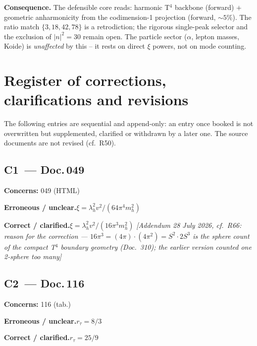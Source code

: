 \textbf{Consequence.} The defensible core reads: harmonic T$^4$ backbone
(forward) $+$ geometric anharmonicity from the codimension-1 projection
(forward, $\sim5\%$). The ratio match $\{3,18,42,78\}$ is a retrodiction; the
rigorous single-peak selector and the exclusion of $|n|^2=30$ remain open. The
particle sector ($\alpha$, lepton masses, Koide) is \emph{unaffected} by this
-- it rests on direct $\xi$ powers, not on mode counting.

\section{Register of corrections, clarifications and revisions}

\noindent The following entries are sequential and append-only: an entry once booked is not overwritten but supplemented, clarified or withdrawn by a later one. The source documents are not revised (cf.\ R50).


\subsection*{C1~--- Doc.\,049}

\noindent\textbf{Concerns:} 049 (HTML)


\smallskip\noindent\textbf{Erroneous / unclear.}\quad $\xi = \lambda_h^2 v^2/(64\pi^4 m_h^2)$


\smallskip\noindent\textbf{Correct / clarified.}\quad $\xi = \lambda_h^2 v^2/(16\pi^3 m_h^2)$ \emph{[Addendum 28 July 2026, cf.\ R66: reason for the correction --- $16\pi^3 = (4\pi)\cdot(4\pi^2) = S^2\cdot 2S^3$ is the sphere count of the compact T$^4$ boundary geometry (Doc.~310); the earlier version counted one 2-sphere too many]}


\medskip


\subsection*{C2~--- Doc.\,116}

\noindent\textbf{Concerns:} 116 (tab.)


\smallskip\noindent\textbf{Erroneous / unclear.}\quad $r_\tau = 8/3$


\smallskip\noindent\textbf{Correct / clarified.}\quad $r_\tau = 25/9$


\medskip



